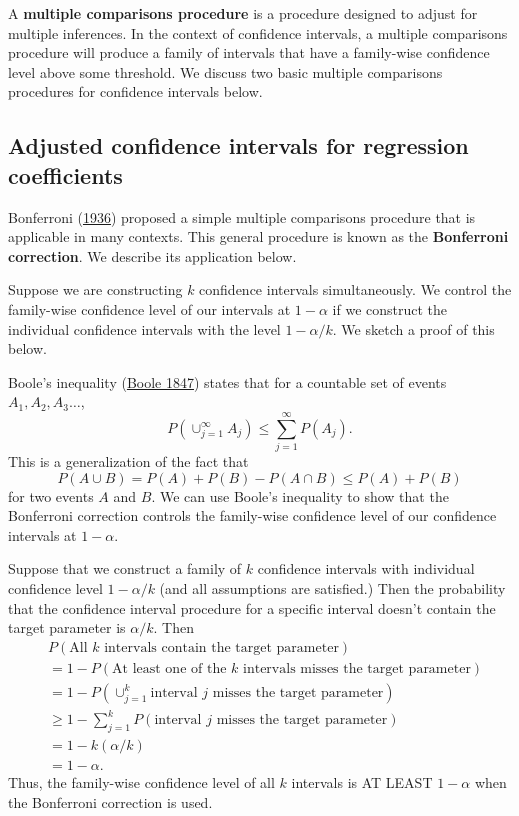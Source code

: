 \documentclass[
]{book}
\theoremstyle{definition}
\theoremstyle{definition}
\theoremstyle{definition}
\theoremstyle{definition}
\theoremstyle{remark}
\begin{document}
A \textbf{multiple comparisons procedure} is a procedure designed to adjust for multiple inferences. In the context of confidence intervals, a multiple comparisons procedure will produce a family of intervals that have a family-wise confidence level above some threshold. We discuss two basic multiple comparisons procedures for confidence
intervals below.

\hypertarget{adjusted-cis-betas}{%
\subsection{Adjusted confidence intervals for regression coefficients}\label{adjusted-cis-betas}}

Bonferroni (\protect\hyperlink{ref-bonferroni1936}{1936}) proposed a simple multiple comparisons procedure that is applicable in many contexts. This general procedure is known as the \textbf{Bonferroni correction}. We describe its application below.

Suppose we are constructing \(k\) confidence intervals simultaneously. We control the family-wise confidence level of our intervals at \(1-\alpha\) if we construct the individual confidence intervals with the level \(1-\alpha/k\). We sketch a proof of this below.

Boole's inequality (\protect\hyperlink{ref-boole}{Boole 1847}) states that for a countable set of events \(A_1, A_2, A_3 \ldots\),
\[P(\cup_{j=1}^\infty A_j) \leq \sum_{j=1}^\infty P(A_j).\] This is a
generalization of the fact that
\[
P(A \cup B) = P(A) + P(B) - P(A\cap B) \leq P(A) + P(B)
\]
for two events \(A\) and \(B\). We can use Boole's inequality to show that the Bonferroni correction controls the family-wise confidence level of our confidence intervals at \(1-\alpha\).

Suppose that we construct a family of \(k\) confidence intervals with individual confidence level \(1-\alpha/k\) (and all assumptions are satisfied.) Then the probability that the confidence interval procedure for a specific interval doesn't contain the target parameter is
\(\alpha/k\). Then
\[
\begin{aligned}
& P(\mbox{All }k\mbox{ intervals contain the target parameter}) \\
& = 1 - P(\mbox{At least one of the }k\mbox{ intervals misses the target parameter}) \\
& = 1 - P(\cup_{j=1}^k \mbox{interval }j\mbox{ misses the target parameter}) \\
& \geq 1 - \sum_{j=1}^k P(\mbox{interval }j\mbox{ misses the target parameter}) \\
& = 1 - k(\alpha/k) \\
&= 1-\alpha.
\end{aligned}
\]
Thus, the family-wise confidence level of all \(k\) intervals is AT LEAST \(1-\alpha\) when the Bonferroni correction is used.
\end{document}
